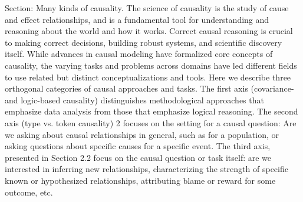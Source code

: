 
Section: Many kinds of causality. The science of causality is the study of cause and effect relationships, and is a fundamental tool for understanding
and reasoning about the world and how it works. Correct causal reasoning is crucial to making correct decisions,
building robust systems, and scientific discovery itself. While advances in causal modeling have formalized core
concepts of causality, the varying tasks and problems across domains have led different fields to use related but distinct
conceptualizations and tools.
Here we describe three orthogonal categories of causal approaches and tasks. The first axis (covariance- and logic-based
causality) distinguishes methodological approaches that emphasize data analysis from those that emphasize logical
reasoning. The second axis (type vs. token causality) 2 focuses on the setting for a causal question: Are we asking
about causal relationships in general, such as for a population, or asking questions about specific causes for a specific
event. The third axis, presented in Section 2.2 focus on the causal question or task itself: are we interested in inferring
new relationships, characterizing the strength of specific known or hypothesized relationships, attributing blame or
reward for some outcome, etc. \textcite{kiciman2023causal}

